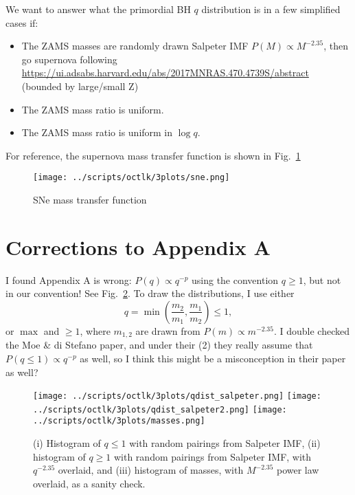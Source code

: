 \documentclass[11pt,
        usenames, %
        dvipsnames %
    ]{article}
\newcommand*{\p}[1]{\left(#1\right)}
\begin{document}
We want to answer what the primordial BH $q$ distribution is in a few simplified
cases if:
\begin{itemize}
    \item The ZAMS masses are randomly drawn Salpeter IMF $P(M) \propto
        M^{-2.35}$, then go supernova following
        \url{https://ui.adsabs.harvard.edu/abs/2017MNRAS.470.4739S/abstract}
        (bounded by large/small Z)

    \item The ZAMS mass ratio is uniform.

    \item The ZAMS mass ratio is uniform in $\log q$.
\end{itemize}

For reference, the supernova mass transfer function is shown in
Fig.~\ref{fig:sne}
\begin{figure}[t]
    \centering
    \texttt{[image: ../scripts/octlk/3plots/sne.png]}
    \caption{SNe mass transfer function}\label{fig:sne}
\end{figure}

\section{Corrections to Appendix A}

I found Appendix A is wrong: $P(q) \propto q^{-p}$ using the convention $q \geq
1$, but not in our convention! See Fig.~\ref{fig:1}. To draw the distributions,
I use either
\begin{equation}
    q = \min\p{\frac{m_2}{m_1}, \frac{m_1}{m_2}} \leq 1,
\end{equation}
or $\max$ and $\geq 1$, where $m_{1,2}$ are drawn from $P(m) \propto m^{-2.35}$.
I double checked the Moe \& di Stefano paper, and under their (2) they really
assume that $P(q \leq 1) \propto q^{-p}$ as well, so I think this might be a
misconception in their paper as well?
\begin{figure}
    \centering
    \texttt{[image: ../scripts/octlk/3plots/qdist\_salpeter.png]}
    \texttt{[image: ../scripts/octlk/3plots/qdist\_salpeter2.png]}
    \texttt{[image: ../scripts/octlk/3plots/masses.png]}
    \caption{(i) Histogram of $q \leq 1$ with random pairings from Salpeter IMF,
    (ii) histogram of $q \geq 1$ with random pairings from Salpeter IMF, with $q
    ^{ -2.35}$ overlaid, and (iii) histogram of masses, with $M^{-2.35}$ power
    law overlaid, as a sanity check.}\label{fig:1}
\end{figure}
\end{document}
